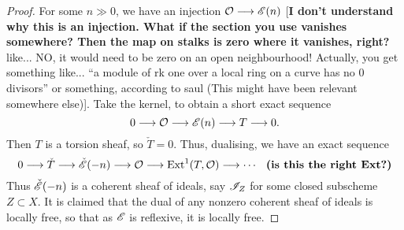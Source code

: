 \documentclass[11pt]{article}
\begin{document}
\begin{proof}
For some $n\gg0$, we have an injection $\mathcal{O}\longrightarrow\mathscr{E}(n)$ [\textbf{I don't
understand why this is an injection. What if the section you use vanishes
somewhere? Then the map on stalks is zero where it vanishes, right?} like... NO,
it would need to be zero on an open neighbourhood! Actually, you get something
like... ``a module of rk one over a local ring on a curve has no 0 divisors'' or
something, according to saul (This might have been relevant somewhere else)].
Take the kernel, to obtain a short exact sequence
\[0\longrightarrow\mathcal{O}\longrightarrow\mathscr{E}(n)\longrightarrow T\longrightarrow 0.\]
Then $T$ is a torsion sheaf, so $\check T=0$. Thus, dualising, we have an exact
sequence
\[0\longrightarrow\check T\longrightarrow\check{\mathscr{E}}(-n)\longrightarrow\mathcal{O}\longrightarrow\operatorname{Ext}^1(T,\mathcal{O})\longrightarrow\cdots
\textbf{ \ (is this the right Ext?)}\]
Thus $\check {\mathscr{E}}(-n)$ is a coherent sheaf of ideals, say $\mathscr{I}_Z$ for some
closed subscheme $Z\subset X$. It is claimed that the dual of any nonzero
coherent sheaf of ideals is locally free, so that as $\mathscr{E}$ is reflexive, it is
locally free.
\end{proof}
\end{document}
